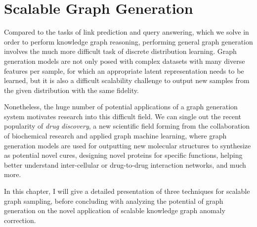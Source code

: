 \chapter{Scalable Graph Generation}
\label{chp: generation}

Compared to the tasks of link prediction and query answering, which we solve in order to perform knowledge graph reasoning, performing general graph generation involves the much more difficult task of discrete distribution learning. Graph generation models are not only posed with complex datasets with many diverse features per sample, for which an appropriate latent representation needs to be learned, but it is also a difficult scalability challenge to output new samples from the given distribution with the same fidelity. 

Nonetheless, the huge number of potential applications of a graph generation system motivates research into this difficult field. We can single out the recent popularity of \emph{drug discovery}, a new scientific field forming from the collaboration of biochemical research and applied graph machine learning, where graph generation models are used for outputting new molecular structures to synthesize as potential novel cures, designing novel proteins for specific functions, helping better understand inter-cellular or drug-to-drug interaction networks, and much more.

In this chapter, I will give a detailed presentation of three techniques for scalable graph sampling, before concluding with analyzing the potential of graph generation on the novel application of scalable knowledge graph anomaly correction.







